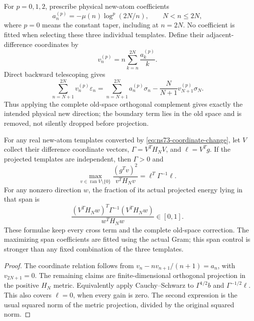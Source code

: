 For $p=0,1,2$, prescribe physical new-atom coefficients
\[
 a^{(p)}_n=-\mu(n)\log^p(2N/n),\qquad N<n\leq2N,
\]
where $p=0$ means the constant taper, including at $n=2N$.
No coefficient is fitted when selecting these three individual templates.
Define their adjacent-difference coordinates by
\begin{equation}
 v^{(p)}_n=n\sum_{k=n}^{2N}\frac{a^{(p)}_k}{k}.
 \label{eq:ns73-coordinate-change}
\end{equation}
Direct backward telescoping gives
\[
 \sum_{n=N+1}^{2N}v^{(p)}_n\varepsilon_n
 =\sum_{n=N+1}^{2N}a^{(p)}_n\sigma_n
                  -\frac{N}{N+1}v^{(p)}_{N+1}\sigma_N.
\]
Thus applying the complete old-space orthogonal complement gives exactly
the intended physical new direction; the boundary term lies in the old
space and is removed, not silently dropped before projection.

\begin{proposition}
\label{prop:ns73-span}
For any real new-atom templates converted by
\eqref{eq:ns73-coordinate-change}, let $V$ collect their difference
coordinate vectors, $\Gamma=V^TH_NV$, and $\ell=V^Tg$.
If the projected templates are independent, then $\Gamma>0$ and
\[
 \max_{v\in\operatorname{ran}V\setminus\{0\}}
       \frac{(g^Tv)^2}{v^TH_Nv}=\ell^T\Gamma^{-1}\ell.
\]
For any nonzero direction $w$, the fraction of its actual projected
energy lying in that span is
\[
 \frac{(V^TH_Nw)^T\Gamma^{-1}(V^TH_Nw)}{w^TH_Nw}\in[0,1].
\]
These formulae keep every cross term and the complete old-space correction.
The maximizing span coefficients are fitted using the actual Gram; this
span control is stronger than any fixed combination of the three templates.
\end{proposition}
\begin{proof}
The coordinate relation follows from
$v_n-nv_{n+1}/(n+1)=a_n$, with $v_{2N+1}=0$.
The remaining claims are finite-dimensional orthogonal projection in the
positive $H_N$ metric. Equivalently apply Cauchy--Schwarz to
$\Gamma^{1/2}b$ and $\Gamma^{-1/2}\ell$. This also covers $\ell=0$,
when every gain is zero. The second expression is the usual squared norm
of the metric projection, divided by the original squared norm.
\end{proof}

